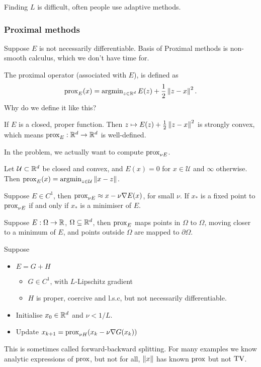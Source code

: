 \documentclass[12pt]{article}
\begin{document}
Finding $L$ is difficult, often people use adaptive methods. 

\subsubsection{Proximal methods}
Suppose $E$ is not necessarily differentiable. Basis of Proximal methods is non-smooth calculus, which we don't have time for.

The proximal operator (associated with $E$), is defined as 
\begin{equation*}
    \operatorname{prox}_E(x) = \operatorname{argmin}_{z\in\mathbb{R}^d} E(z) + \frac{1}{2}\left\lVert z-x\right\rVert^2.
\end{equation*}
Why do we define it like this?
\begin{theorem}
    If $E$ is a closed, proper function. Then $z\mapsto E(z) + \frac{1}{2}\left\lVert z-x\right\rVert^2$ is strongly convex, which means $\operatorname{prox}_E:\mathbb{R}^d\to\mathbb{R}^d$ is well-defined.
\end{theorem}
In the problem, we actually want to compute $\operatorname{prox}_{\nu E}$. 

Let $\mathcal{U}\subset \mathbb{R}^d$ be closed and convex, and $E(x) = 0$ for $x\in \mathcal{U}$ and $\infty$ otherwise. Then $\operatorname{prox}_E(x) = \operatorname{argmin}_{z\in \mathcal{U}} \left\lVert x-z\right\rVert$. 

Suppose $E\in C^1$, then $\operatorname{prox}_{\nu E} \approx x- \nu \nabla E(x)$, for small $\nu$. If $x_*$ is a fixed point to $\operatorname{prox}_{\nu E}$ if and only if $x_*$ is a minimiser of $E$. 

Suppose $E:\Omega\to\mathbb{R}$, $\Omega\subseteq \mathbb{R}^d$, then $\operatorname{prox}_E$ maps points in $\Omega$ to $\Omega$, moving closer to a minimum of $E$, and points outside $\Omega$ are mapped to $\partial \Omega$. 

Suppose 
\begin{itemize}
    \item $E=G+H$
    \begin{itemize}
        \item $G\in C^1$, with $L$-Lipschitz gradient
        \item $H$ is proper, coercive and l.s.c, but not necessarily differentiable.
    \end{itemize}
    \item Initialise $x_0\in\mathbb{R}^d$ and $\nu<1/L$.
    \item Update $x_{k+1} = \operatorname{prox}_{\nu H}(x_k - \nu \nabla G(x_k))$
\end{itemize}

This is sometimes called forward-backward splitting.
For many examples we know analytic expressions of $\operatorname{prox}$, but not for all, $\left\lVert x\right\rVert$ has known $\operatorname{prox}$ but not $\operatorname{TV}$.
\end{document}
